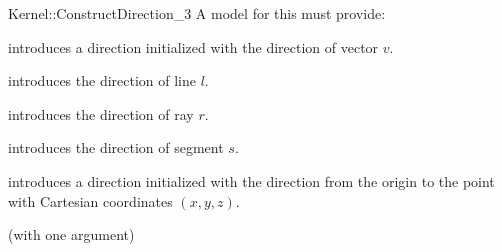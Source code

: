 \begin{ccRefFunctionObjectConcept}{Kernel::ConstructDirection_3}
A model for this must provide:


            {introduces a direction  initialized with the 
             direction of vector $v$.}

            {introduces the direction of line $l$.}

            {introduces the direction of ray $r$.}

            {introduces the direction of segment $s$.}

\ccHidden{}
            {introduces a direction  initialized with the direction 
             from the origin to the point with Cartesian coordinates $(x, y, z)$.}

\ccRefines
{} (with one argument)

\ccSeeAlso

  \\

\end{ccRefFunctionObjectConcept}

